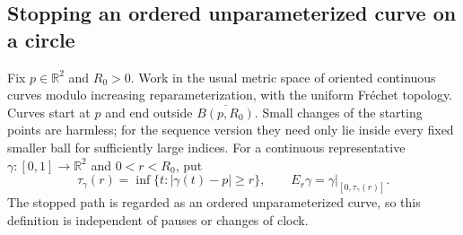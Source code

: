 \documentclass[11pt]{article}
\theoremstyle{definition}\newtheorem{definition}[theorem]{Definition}
\theoremstyle{remark}\newtheorem{remark}[theorem]{Remark}
\begin{document}
\subsection{Stopping an ordered unparameterized curve on a circle}

Fix $p\in\mathbb R^2$ and $R_0>0$. Work in the usual metric space of oriented
continuous curves modulo increasing reparameterization, with the uniform
Fr\'echet topology. Curves start at $p$ and end outside
$\overline{B(p,R_0)}$. Small changes of the starting points are harmless;
for the sequence version they need only lie inside every fixed smaller ball
for sufficiently large indices.
For a continuous representative $\gamma:[0,1]\to\mathbb R^2$ and
$0<r<R_0$, put
\[
 \tau_\gamma(r)=\inf\{t:|\gamma(t)-p|\geq r\},\qquad
 E_r\gamma=\gamma|_{[0,\tau_\gamma(r)]}.
 \tag{LT1}
\]
The stopped path is regarded as an ordered unparameterized curve, so this
definition is independent of pauses or changes of clock.
\end{document}
